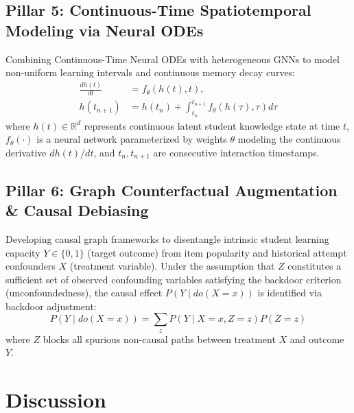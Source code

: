 \documentclass[10pt,journal,compsoc]{IEEEtran}
\begin{document}
\subsection{Pillar 5: Continuous-Time Spatiotemporal Modeling via Neural ODEs}
Combining Continuous-Time Neural ODEs with heterogeneous GNNs to model non-uniform learning intervals and continuous memory decay curves:
\begin{equation}
\begin{split}
\frac{dh(t)}{dt} &= f_\theta(h(t), t), \\
h(t_{n+1}) &= h(t_n) + \int_{t_n}^{t_{n+1}} f_\theta(h(\tau), \tau) d\tau
\end{split}
\end{equation}
where $h(t) \in \mathbb{R}^d$ represents continuous latent student knowledge state at time $t$, $f_\theta(\cdot)$ is a neural network parameterized by weights $\theta$ modeling the continuous derivative $dh(t)/dt$, and $t_n, t_{n+1}$ are consecutive interaction timestamps.

\subsection{Pillar 6: Graph Counterfactual Augmentation \& Causal Debiasing}
Developing causal graph frameworks to disentangle intrinsic student learning capacity $Y \in \{0, 1\}$ (target outcome) from item popularity and historical attempt confounders $X$ (treatment variable). Under the assumption that $Z$ constitutes a sufficient set of observed confounding variables satisfying the backdoor criterion (unconfoundedness), the causal effect $P(Y \mid do(X = x))$ is identified via backdoor adjustment:
\begin{equation}
P(Y \mid do(X = x)) = \sum_{z} P(Y \mid X = x, Z = z) P(Z = z)
\end{equation}
where $Z$ blocks all spurious non-causal paths between treatment $X$ and outcome $Y$.

\section{Discussion}
\end{document}
